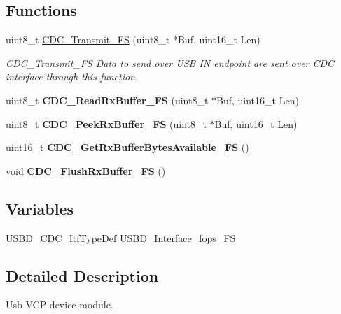 \subsection*{Functions}
\begin{DoxyCompactItemize}
\item 
uint8\+\_\+t \hyperlink{group__USBD__CDC__IF_ga5137d6201dbdef2bf351c5b4941c24f4}{C\+D\+C\+\_\+\+Transmit\+\_\+\+FS} (uint8\+\_\+t $\ast$Buf, uint16\+\_\+t Len)
\begin{DoxyCompactList}\small\item\em C\+D\+C\+\_\+\+Transmit\+\_\+\+FS Data to send over U\+SB IN endpoint are sent over C\+DC interface through this function. \end{DoxyCompactList}\item 
\mbox{\label{group__USBD__CDC__IF_gaead3fffa49044739a80019b38773e737}} 
uint8\+\_\+t {\bfseries C\+D\+C\+\_\+\+Read\+Rx\+Buffer\+\_\+\+FS} (uint8\+\_\+t $\ast$Buf, uint16\+\_\+t Len)
\item 
\mbox{\label{group__USBD__CDC__IF_gabad1adbe14c715be19809826ef138ee6}} 
uint8\+\_\+t {\bfseries C\+D\+C\+\_\+\+Peek\+Rx\+Buffer\+\_\+\+FS} (uint8\+\_\+t $\ast$Buf, uint16\+\_\+t Len)
\item 
\mbox{\label{group__USBD__CDC__IF_ga315db679a6baef461e36e4004875497e}} 
uint16\+\_\+t {\bfseries C\+D\+C\+\_\+\+Get\+Rx\+Buffer\+Bytes\+Available\+\_\+\+FS} ()
\item 
\mbox{\label{group__USBD__CDC__IF_gad0a4aef5cb4eebc6896b8d97da7c2ac6}} 
void {\bfseries C\+D\+C\+\_\+\+Flush\+Rx\+Buffer\+\_\+\+FS} ()
\end{DoxyCompactItemize}
\subsection*{Variables}
\begin{DoxyCompactItemize}
\item 
U\+S\+B\+D\+\_\+\+C\+D\+C\+\_\+\+Itf\+Type\+Def \hyperlink{group__USBD__CDC__IF_ga99394ed19b774f171df96c2848c411ed}{U\+S\+B\+D\+\_\+\+Interface\+\_\+fops\+\_\+\+FS}
\end{DoxyCompactItemize}


\subsection{Detailed Description}
Usb V\+CP device module. 




